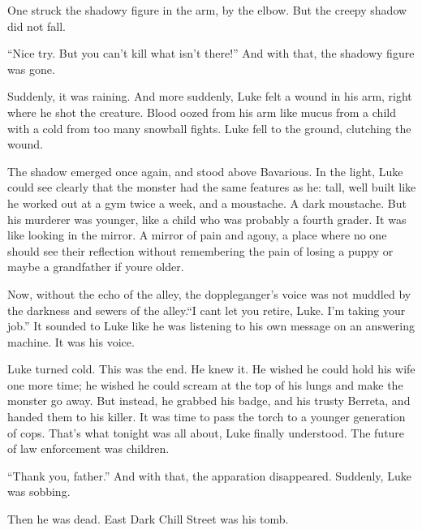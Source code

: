 One struck the shadowy figure in the arm, by the elbow. But the
creepy shadow did not fall.



``Nice try. But you can't kill what isn't there!'' And with that, the
shadowy figure was gone.



Suddenly, it was raining. And more suddenly, Luke felt a wound in
his arm, right where he shot the creature. Blood oozed from his arm
like mucus from a child with a cold from too many snowball fights.
Luke fell to the ground, clutching the wound.





The shadow emerged once again, and stood above Bavarious. In the
light, Luke could see clearly that the monster had the same
features as he: tall, well built like he worked out at a gym twice
a week, and a moustache. A dark moustache. But his murderer was
younger, like a child who was probably a fourth grader. It was like
looking in the mirror. A mirror of pain and agony, a place where no
one should see their reflection without remembering the pain of
losing a puppy or maybe a grandfather if youre older.



Now, without the echo of the alley, the doppleganger's voice was
not muddled by the darkness and sewers of the alley.``I cant let you
retire, Luke. I'm taking your job.'' It sounded to Luke like he was
listening to his own message on an answering machine. It was his
voice.



Luke turned cold. This was the end. He knew it. He wished he could
hold his wife one more time; he wished he could scream at the top
of his lungs and make the monster go away. But instead, he grabbed
his badge, and his trusty Berreta, and handed them to his killer.
It was time to pass the torch to a younger generation of cops.
That's what tonight was all about, Luke finally understood. The
future of law enforcement was children.



``Thank you, father.'' And with that, the apparation disappeared.
Suddenly, Luke was sobbing.



Then he was dead. East Dark Chill Street was his tomb. 

 



